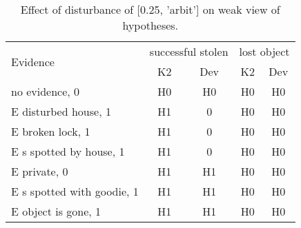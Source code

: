 \begin{table}\begin{tabular}{l|cc|cc}\toprule\multirow{2}{*}{Evidence} & \multicolumn{2}{c}{successful stolen}& \multicolumn{2}{c}{lost object}\\& {K2} & {Dev}& {K2} & {Dev}\\\midrule
no evidence, 0 & H0&H0&H0&H0\\E disturbed house, 1 & \cellcolor{Bittersweet}H1&\cellcolor{Bittersweet}0&H0&H0\\E broken lock, 1 & \cellcolor{Bittersweet}H1&\cellcolor{Bittersweet}0&H0&H0\\E s spotted by house, 1 & \cellcolor{Bittersweet}H1&\cellcolor{Bittersweet}0&H0&H0\\E private, 0 & H1&H1&H0&H0\\E s spotted with goodie, 1 & H1&H1&H0&H0\\E object is gone, 1 & H1&H1&H0&H0\\\bottomrule\end{tabular}\caption{Effect of disturbance of [0.25, 'arbit'] on weak view of hypotheses.}\end{table}